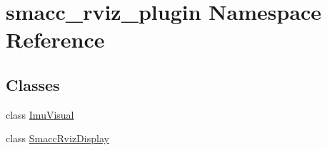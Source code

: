 \hypertarget{namespacesmacc__rviz__plugin}{}\section{smacc\+\_\+rviz\+\_\+plugin Namespace Reference}
\label{namespacesmacc__rviz__plugin}
\subsection*{Classes}
\begin{DoxyCompactItemize}
\item 
class \hyperlink{classsmacc__rviz__plugin_1_1ImuVisual}{Imu\+Visual}
\item 
class \hyperlink{classsmacc__rviz__plugin_1_1SmaccRvizDisplay}{Smacc\+Rviz\+Display}
\end{DoxyCompactItemize}
